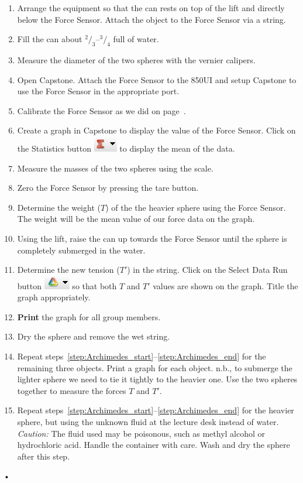\documentclass[main.tex]{subfiles}
\begin{document}
\begin{enumerate}
\item
Arrange the equipment so that the can rests on top of the lift and directly below the Force Sensor. Attach the object to the Force Sensor via a string.
\item
Fill the can about $^2\!/_3$--$^3\!/_4$ full of water.
\item
Measure the diameter of the two spheres with the vernier calipers.
\item
Open Capstone. Attach the Force Sensor to the 850UI and setup Capstone to use the Force Sensor in the appropriate port.
\item
Calibrate the Force Sensor as we did on page~\pageref{page:Calibration}.
\item
Create a graph in Capstone to display the value of the Force Sensor. Click on the Statistics button \includegraphics{Statistics} to display the mean of the data.
\item \label{step:Archimedes_start}
Measure the masses of the two spheres using the scale.
\item
Zero the Force Sensor by pressing the tare button.
\item \label{step:T}
Determine the weight ($T$) of the the heavier sphere using the Force Sensor. The weight will be the mean value of our force data on the graph.
\item
Using the lift, raise the can up towards the Force Sensor until the sphere is completely submerged in the water.
\item \label{step:T'}
Determine the new tension ($T'$) in the string. Click on the Select Data Run button \includegraphics{Select_Data_Run} so that both $T$ and $T'$ values are shown on the graph. Title the graph appropriately.
\item
\textbf{Print} the graph for all group members.
\item \label{step:Archimedes_end}
Dry the sphere and remove the wet string.
\item \label{step:repeat}
Repeat steps~\ref{step:Archimedes_start}--\ref{step:Archimedes_end} for the remaining three objects. Print a graph for each object. n.b., to submerge the lighter sphere we need to tie it tightly to the heavier one. Use the two spheres together to measure the forces $T$ and $T'.$
\item \label{step:fluid}
Repeat steps~\ref{step:Archimedes_start}--\ref{step:Archimedes_end} for the heavier sphere, but using the unknown fluid at the lecture desk instead of water. \emph{Caution:} The fluid used may be poisonous, such as methyl alcohol or hydrochloric acid. Handle the container with care. Wash and dry the sphere after this step.
\end{enumerate}•
\end{document}
